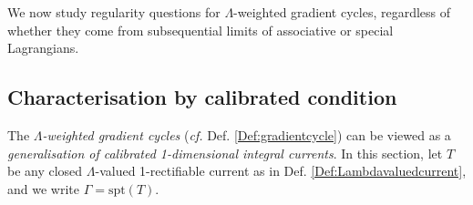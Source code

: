\documentclass{article}
\theoremstyle{definition}
\newcommand{\cf}{\emph{cf.} }
\begin{document}
		
		
		We now study regularity questions for $\Lambda$-weighted gradient cycles, regardless of whether they come from subsequential limits of associative or special Lagrangians.
		
				
	\subsection{Characterisation by calibrated condition}
	
	
	The \emph{$\Lambda$-weighted gradient cycles} (\cf Def. \ref{Def:gradientcycle}) can be viewed as a \emph{generalisation of calibrated 1-dimensional integral currents}.  In this section, let $T$ be any closed $\Lambda$-valued 1-rectifiable current as in Def. \ref{Def:Lambdavaluedcurrent}, and we write $\Gamma=\text{spt}(T)$.
	
	
	
\end{document}
